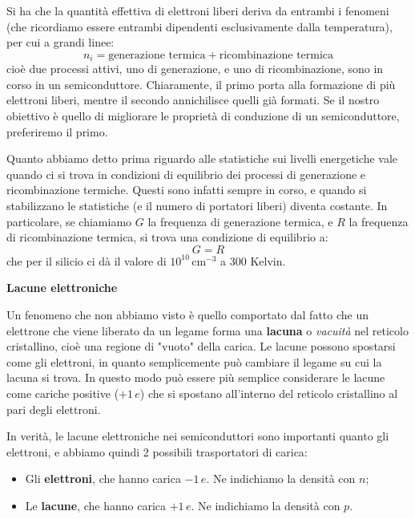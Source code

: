 \documentclass[a4paper,11pt]{article}
\begin{document}
Si ha che la quantità effettiva di elettroni liberi deriva da entrambi i fenomeni (che ricordiamo essere entrambi dipendenti esclusivamente dalla temperatura), per cui a grandi linee:
$$
n_i = \text{generazione termica} + \text{ricombinazione termica}
$$
cioè due processi attivi, uno di generazione, e uno di ricombinazione, sono in corso in un semiconduttore. Chiaramente, il primo porta alla formazione di più elettroni liberi, mentre il secondo annichilisce quelli già formati. Se il nostro obiettivo è quello di migliorare le proprietà di conduzione di un semiconduttore, preferiremo il primo. 

Quanto abbiamo detto prima riguardo alle statistiche sui livelli energetiche vale quando ci si trova in condizioni di equilibrio dei processi di generazione e ricombinazione termiche. Questi sono infatti sempre in corso, e quando si stabilizzano le statistiche (e il numero di portatori liberi) diventa costante.
In particolare, se chiamiamo $G$ la frequenza di generazione termica, e $R$ la frequenza di ricombinazione termica, si trova una condizione di equilibrio a:
$$
G = R
$$
che per il silicio ci dà il valore di $10^{10} \, \mathrm{cm}^{-3}$ a 300 Kelvin.

\newpage

\noindent
\textbf{\textsf{Lacune elettroniche}}

\noindent
Un fenomeno che non abbiamo visto è quello comportato dal fatto che un elettrone che viene liberato da un legame forma una \textbf{lacuna} o \textit{vacuità} nel reticolo cristallino, cioè una regione di "vuoto" della carica.
Le lacune possono spostarsi come gli elettroni, in quanto semplicemente può cambiare il legame su cui la lacuna si trova. 
In questo modo può essere più semplice considerare le lacune come cariche positive ($+1 \, e$) che si spostano all'interno del reticolo cristallino al pari degli elettroni.

In verità, le lacune elettroniche nei semiconduttori sono importanti quanto gli elettroni, e abbiamo quindi 2 possibili trasportatori di carica:
\begin{itemize}
	\item Gli \textbf{elettroni}, che hanno carica $-1 \, e$. Ne indichiamo la densità con $n$;
	\item Le \textbf{lacune}, che hanno carica $+1 \, e$. Ne indichiamo la densità con $p$.
\end{itemize}
\end{document}
